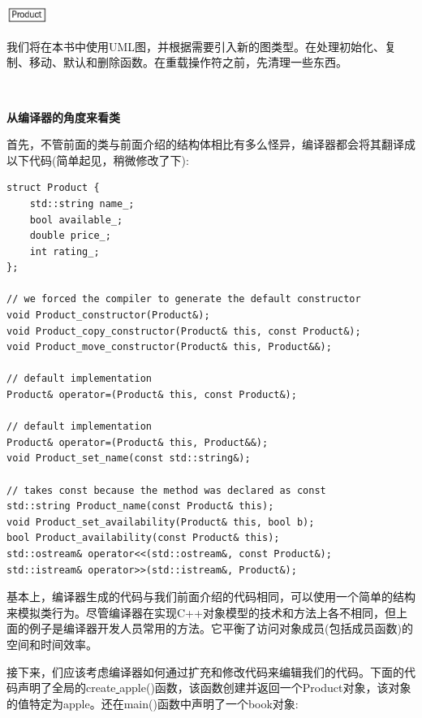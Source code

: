 \begin{center}
	\includegraphics[width=0.1\textwidth]{content/Section-1/Chapter-3/6}
\end{center}

我们将在本书中使用UML图，并根据需要引入新的图类型。在处理初始化、复制、移动、默认和删除函数。在重载操作符之前，先清理一些东西。 \par

\noindent\textbf{}\ \par
\textbf{从编译器的角度来看类} \ \par
首先，不管前面的类与前面介绍的结构体相比有多么怪异，编译器都会将其翻译成以下代码(简单起见，稍微修改了下):\par

\begin{lstlisting}[caption={}]
struct Product {
	std::string name_;
	bool available_;
	double price_;
	int rating_;
};

// we forced the compiler to generate the default constructor
void Product_constructor(Product&);
void Product_copy_constructor(Product& this, const Product&);
void Product_move_constructor(Product& this, Product&&);

// default implementation
Product& operator=(Product& this, const Product&);

// default implementation
Product& operator=(Product& this, Product&&);
void Product_set_name(const std::string&);

// takes const because the method was declared as const
std::string Product_name(const Product& this);
void Product_set_availability(Product& this, bool b);
bool Product_availability(const Product& this);
std::ostream& operator<<(std::ostream&, const Product&);
std::istream& operator>>(std::istream&, Product&);
\end{lstlisting}

基本上，编译器生成的代码与我们前面介绍的代码相同，可以使用一个简单的结构来模拟类行为。尽管编译器在实现C++对象模型的技术和方法上各不相同，但上面的例子是编译器开发人员常用的方法。它平衡了访问对象成员(包括成员函数)的空间和时间效率。 \par
接下来，们应该考虑编译器如何通过扩充和修改代码来编辑我们的代码。下面的代码声明了全局的create\underline{ }apple()函数，该函数创建并返回一个Product对象，该对象的值特定为apple。还在main()函数中声明了一个book对象: \par

